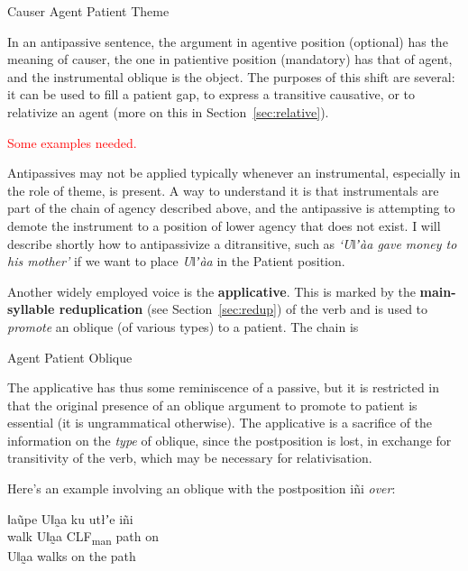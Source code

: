 \documentclass[11pt,a5paper]{book}
\newcommand{\qcn}[1]{\textcolor{AccentText}{\large#1}}
\newcommand{\transl}[2]{\qcn{#1} \emph{#2}}
\newcommand{\grammsc}[1]{\textsc{#1}}
\newcommand{\CLF}[1]{\grammsc{CLF}\textsubscript{#1}}
\newcommand{\cmnt}[1]{\textcolor{red}{#1}}
\begin{document}
\begin{center}
	Causer \textrightarrow Agent \textrightarrow Patient \textrightarrow Theme
\end{center}

In an antipassive sentence, the argument in agentive position (optional) has the meaning of causer, the one in patientive position (mandatory) has that of agent, and the instrumental oblique is the object. The purposes of this shift are several: it can be used to fill a patient gap, to express a transitive causative, or to relativize an agent (more on this in Section~\ref{sec:relative}).

\cmnt{Some examples needed.}

Antipassives may not be applied typically whenever an instrumental, especially in the role of theme, is present. A way to understand it is that instrumentals are part of the chain of agency described above, and the antipassive is attempting to demote the instrument to a position of lower agency that does not exist. I will describe shortly how to antipassivize a ditransitive, such as \emph{`Uǁʼàa gave money to his mother'} if we want to place \emph{Uǁʼàa} in the Patient position.

Another widely employed voice is the \textbf{applicative}. This is marked by the \textbf{main-syllable reduplication} (see Section~\ref{sec:redup}) of the verb and is used to \emph{promote} an oblique (of various types) to a patient. The chain is

\begin{center}
	Agent \textleftarrow Patient \textleftarrow Oblique
\end{center}

The applicative has thus some reminiscence of a passive, but it is restricted in that the original presence of an oblique argument to promote to patient is essential (it is ungrammatical otherwise). The applicative is a sacrifice of the information on the \emph{type} of oblique, since the postposition is lost, in exchange for transitivity of the verb, which may be necessary for relativisation.

Here's an example involving an oblique with the postposition \transl{iñi}{over}:

\begin{exe}
\ex
\gll ǁaũpe Uǁa̰a ku utłʼe iñi\\
walk Uǁa̰a \CLF{man} path on\\
\glt Uǁa̰a walks on the path
\end{exe}
\end{document}

